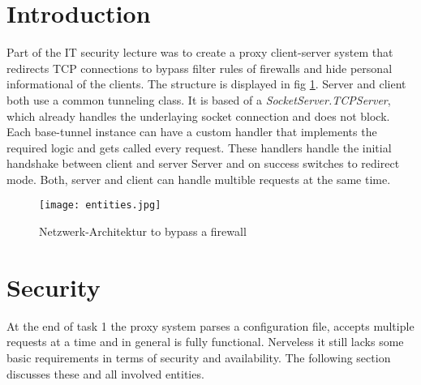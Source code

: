 \documentclass[12pt, a4paper]{scrartcl}
\begin{document}


\tableofcontents
\newpage
{}
\setcounter{lastroman}{\value{page}}

\pagestyle{plain}
\maketitle

\section{Introduction}
Part of the IT security lecture was to create a proxy client-server system that redirects TCP connections to bypass filter rules of firewalls and hide personal informational of the clients. The structure is displayed in fig \ref{fig::arch}. \newline
Server and client both use a common tunneling class. It is based of a \textit{SocketServer.TCPServer}, which already handles the underlaying socket connection and does not block. Each base-tunnel instance can have a custom handler that implements the required logic and gets called every request. These handlers handle the initial handshake between client and server Server and on success switches to redirect mode. Both, server and client can handle multible requests at the same time.

\begin{figure}[H]
    \centering
    \texttt{[image: entities.jpg]}
    \caption{Netzwerk-Architektur to bypass a firewall}
    \label{fig::arch}
\end{figure}

\newpage
\section{Security}
At the end of task 1 the proxy system parses a configuration file, accepts multiple requests at a time and in general is fully functional. Nerveless it still lacks some basic requirements in terms of security and availability. The following section discusses these and all involved entities.
\end{document}
